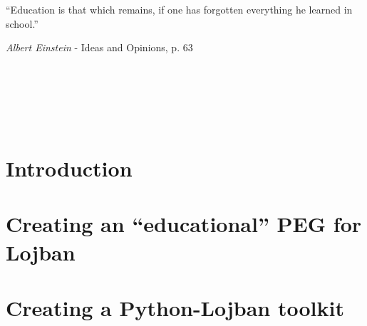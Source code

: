 

\usepackage[
    backend=bibtex, style=verbose, defernumbers=true, backref=true, block=none, hyperref=true
]{biblatex}

\setlength{}




\pagestyle{empty}
\newpage \ \newpage


\newpage \ \newpage

\renewcommand{\epigraphsize}{\large}
\renewcommand{\epigraphwidth}{10cm}
\vspace{3cm}
\epigraph{``Education is that which remains, if one has forgotten everything he learned in school.''}{\textit{Albert Einstein} - Ideas and Opinions, p. 63}
\newpage \ \newpage

%

\vspace{-1cm}
\setcounter{tocdepth}{3}
\tableofcontents
\newpage \ \newpage
\listoffigures
\newpage \ \newpage %

\makeatletter
\@openrightfalse
\makeatother
\pagestyle{fancy}
\part{Introduction}



\part{Creating an ``educational'' PEG for Lojban}


\part{Creating a Python-Lojban toolkit}




